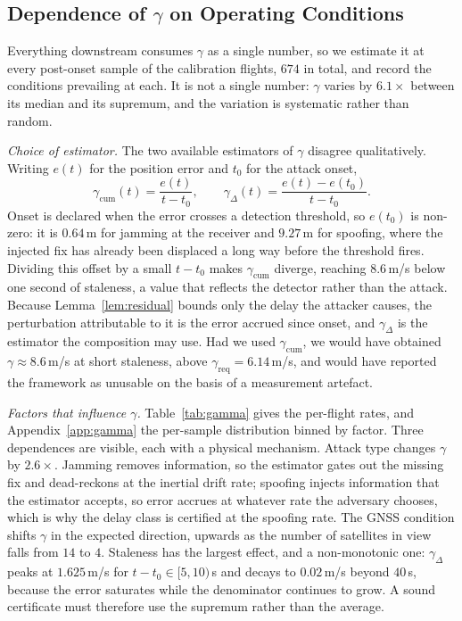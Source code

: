 \subsection{Dependence of $\gamma$ on Operating Conditions}
\label{sec:gammastability}
Everything downstream consumes $\gamma$ as a single number, so we estimate it
at every post-onset sample of the calibration flights, $674$ in total, and
record the conditions prevailing at each. It is not a single number: $\gamma$
varies by $6.1\times$ between its median and its supremum, and the variation is
systematic rather than random.

\emph{Choice of estimator.} The two available estimators of $\gamma$ disagree
qualitatively. Writing $e(t)$ for the position error and $t_0$ for the attack
onset,
\begin{equation}
\label{eq:gammaest}
\gamma_{\mathrm{cum}}(t)=\frac{e(t)}{t-t_0},
\qquad
\gamma_{\Delta}(t)=\frac{e(t)-e(t_0)}{t-t_0}.
\end{equation}
Onset is declared when the error crosses a detection threshold, so $e(t_0)$ is
non-zero: it is $0.64$\,m for jamming at the receiver and $9.27$\,m for
spoofing, where the injected fix has already been displaced a long way before
the threshold fires. Dividing this offset by a small $t-t_0$ makes
$\gamma_{\mathrm{cum}}$ diverge, reaching $8.6$\,m/s below one second of
staleness, a value that reflects the detector rather than the attack. Because
Lemma~\ref{lem:residual} bounds only the delay the attacker causes, the
perturbation attributable to it is the error accrued since onset, and
$\gamma_{\Delta}$ is the estimator the composition may use. Had we used
$\gamma_{\mathrm{cum}}$, we would have obtained $\gamma\approx8.6$\,m/s at short
staleness, above $\gamma_{\mathrm{req}}=6.14$\,m/s, and would have reported the
framework as unusable on the basis of a measurement artefact.

\emph{Factors that influence $\gamma$.} Table~\ref{tab:gamma} gives the
per-flight rates, and Appendix~\ref{app:gamma} the per-sample distribution
binned by factor. Three dependences are visible, each with a physical
mechanism. Attack type changes $\gamma$ by $2.6\times$. Jamming removes
information, so the estimator gates out the missing fix and dead-reckons at the
inertial drift rate; spoofing injects information that the estimator accepts,
so error accrues at whatever rate the adversary chooses, which is why the delay
class is certified at the spoofing rate. The GNSS condition shifts $\gamma$ in
the expected direction, upwards as the number of satellites in view falls from
$14$ to $4$. Staleness has the largest effect, and a non-monotonic one:
$\gamma_{\Delta}$ peaks at $1.625$\,m/s for $t-t_0\in[5,10)$\,s and decays to
$0.02$\,m/s beyond $40$\,s, because the error saturates while the denominator
continues to grow. A sound certificate must therefore use the supremum rather
than the average.

